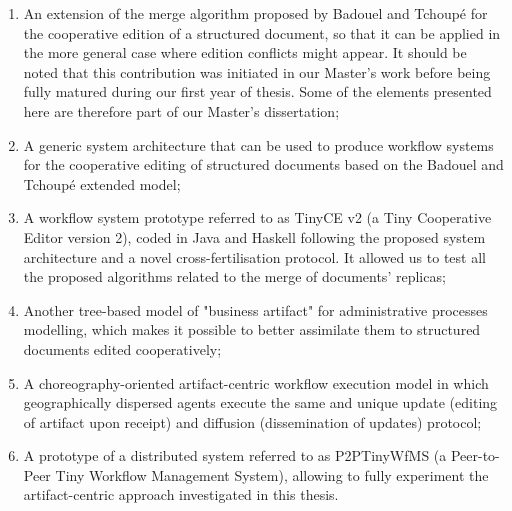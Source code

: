 \begin{enumerate}
	\item An extension of the merge algorithm proposed by Badouel and Tchoup\'e for the cooperative edition of a structured document, so that it can be applied in the more general case where edition conflicts might appear. It should be noted that this contribution was initiated in our Master's work before being fully matured during our first year of thesis. Some of the elements presented here are therefore part of our Master's dissertation;
	
	\item A generic system architecture that can be used to produce workflow systems for the cooperative editing of structured documents based on the Badouel and Tchoup\'e extended model;
	
	\item A workflow system prototype referred to as TinyCE v2 (a Tiny Cooperative Editor version 2), coded in Java and Haskell following the proposed system architecture and a novel cross-fertilisation protocol. It allowed us to test all the proposed algorithms related to the merge of documents' replicas;
	
	\item Another tree-based model of "business artifact" for administrative processes modelling, which makes it possible to better assimilate them to structured documents edited cooperatively;
	
	\item A choreography-oriented artifact-centric workflow execution model in which geographically dispersed agents execute the same and unique update (editing of artifact upon receipt) and diffusion (dissemination of updates) protocol;
	
	\item A prototype of a distributed system referred to as P2PTinyWfMS (a Peer-to-Peer Tiny Workflow Management System), allowing to fully experiment the artifact-centric approach investigated in this thesis.
\end{enumerate}

